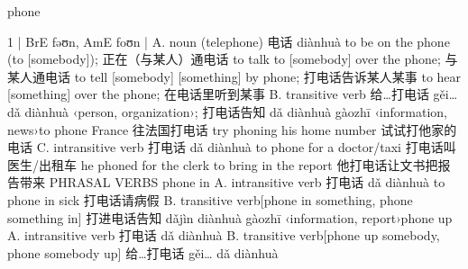 \documentclass[11pt]{ctexart}
\begin{document}
{{{{phone

1 | BrE fəʊn, AmE foʊn |
A. noun (telephone) 电话 diànhuà to be on the phone (to [somebody]); 正在（与某人）通电话 to talk to [somebody] over the phone; 与某人通电话 to tell [somebody] [something] by phone; 打电话告诉某人某事 to hear [something] over the phone; 在电话里听到某事
B. transitive verb 给…打电话 gěi… dǎ diànhuà ‹person, organization›; 打电话告知 dǎ diànhuà gàozhī ‹information, news›to phone France 往法国打电话 try phoning his home number 试试打他家的电话
C. intransitive verb 打电话 dǎ diànhuà to phone for a doctor/taxi 打电话叫医生/出租车 he phoned for the clerk to bring in the report 他打电话让文书把报告带来 PHRASAL VERBS phone in
A. intransitive verb 打电话 dǎ diànhuà to phone in sick 打电话请病假
B. transitive verb[phone in something, phone something in] 打进电话告知 dǎjìn diànhuà gàozhī ‹information, report›phone up
A. intransitive verb 打电话 dǎ diànhuà
B. transitive verb[phone up somebody, phone somebody up] 给…打电话 gěi… dǎ diànhuà
}}}}
\end{document}
